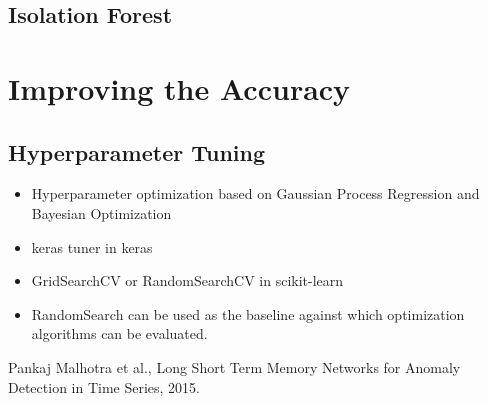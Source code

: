 \documentclass[a4paper, 12pt]{report}
\begin{document}
\section{Isolation Forest}


\chapter{Improving the Accuracy}
\section{Hyperparameter Tuning}
\begin{itemize}
\item Hyperparameter optimization based on Gaussian Process Regression and Bayesian Optimization
\item keras tuner in keras
\item GridSearchCV or RandomSearchCV in scikit-learn
\item RandomSearch can be used as the baseline against which optimization algorithms can be evaluated.
\end{itemize}

\begin{thebibliography}{999}
	Pankaj Malhotra et al.,
	Long Short Term Memory Networks for Anomaly Detection in Time Series,
	2015.
\end{thebibliography}
\end{document}
